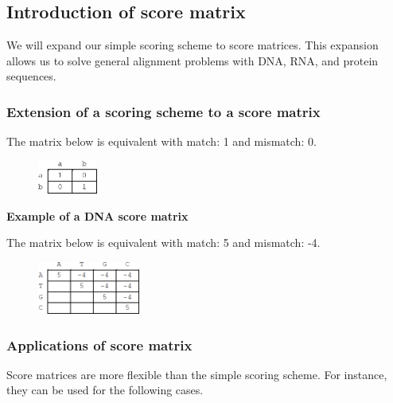 %
%

%
%
\subsection{Introduction of score matrix}
We will expand our simple scoring scheme to score matrices. This expansion allows us to solve general alignment problems with DNA, RNA, and protein sequences. 

%
%
\subsubsection*{Extension of a scoring scheme to a score matrix}
The matrix below is equivalent with match: 1 and mismatch: 0. 

\begin{figure}[H]
  \centering
      \includegraphics[width=0.175\textwidth]{fig03/simple_score_matrix.png}
\end{figure}

\noindent
\textbf{Example of a DNA score matrix}

\noindent
The matrix below is equivalent with match: 5 and mismatch: -4. 

\begin{figure}[H]
  \centering
      \includegraphics[width=0.3\textwidth]{fig03/dna_matrix_exercise.png}
\end{figure}

%
%
\subsubsection*{Applications of score matrix}

Score matrices are more flexible than the simple scoring scheme. For instance, they can be used for the following cases.

